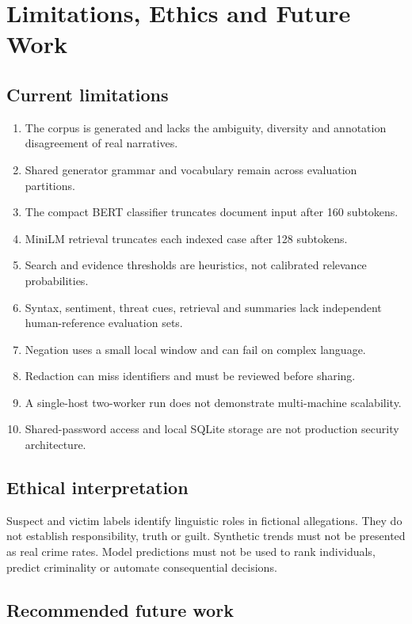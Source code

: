 \documentclass[12pt,a4paper]{report}
\begin{document}
\chapter{Limitations, Ethics and Future Work}

\section{Current limitations}

\begin{enumerate}
  \item The corpus is generated and lacks the ambiguity, diversity and annotation disagreement of real narratives.
  \item Shared generator grammar and vocabulary remain across evaluation partitions.
  \item The compact BERT classifier truncates document input after 160 subtokens.
  \item MiniLM retrieval truncates each indexed case after 128 subtokens.
  \item Search and evidence thresholds are heuristics, not calibrated relevance probabilities.
  \item Syntax, sentiment, threat cues, retrieval and summaries lack independent human-reference evaluation sets.
  \item Negation uses a small local window and can fail on complex language.
  \item Redaction can miss identifiers and must be reviewed before sharing.
  \item A single-host two-worker run does not demonstrate multi-machine scalability.
  \item Shared-password access and local SQLite storage are not production security architecture.
\end{enumerate}

\section{Ethical interpretation}

Suspect and victim labels identify linguistic roles in fictional allegations. They do not establish responsibility, truth or guilt. Synthetic trends must not be presented as real crime rates. Model predictions must not be used to rank individuals, predict criminality or automate consequential decisions.

\section{Recommended future work}
\end{document}
